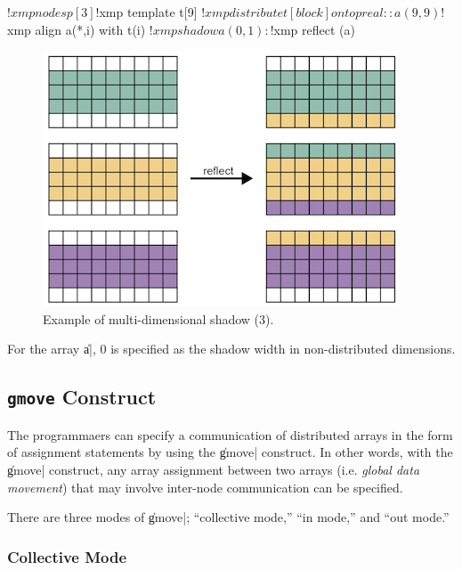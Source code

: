 \begin{XFexample}
!$xmp nodes p[3]
!$xmp template t[9]
!$xmp distribute t[block] onto p
real :: a(9,9)
!$xmp align a(*,i) with t(i)
!$xmp shadow a(0,1)
  :
!$xmp reflect (a)
\end{XFexample}

\begin{figure}
  \centering
  \includegraphics{figs/1of2.png}
  \caption{Example of multi-dimensional shadow (3).}
\end{figure}

For the array \|a|, 0 is specified as the shadow width in
non-distributed dimensions.


\subsection{{\tt gmove} Construct}

The programmaers can specify a communication of distributed arrays in
the form of assignment statements by using the \|gmove| construct.
%
In other words, with the \|gmove| construct, any array assignment
between two arrays (i.e. {\it global data movement}) that may involve
inter-node communication can be specified.

There are three modes of \|gmove|; ``collective mode,'' ``in mode,'' and
``out mode.''

\subsubsection{Collective Mode}

